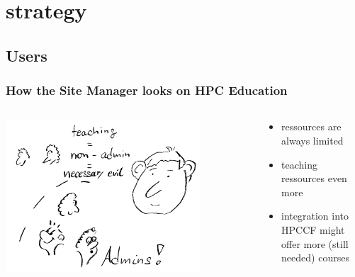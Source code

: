 \section[Certification Strategy]{strategy}

\subsection[What's in for Users]{Users}

\begin{frame}
  \frametitle{How the Site Manager looks on HPC Education}
  \begin{columns}
   \begin{column}{0.6\textwidth}
    \centering
    \includegraphics[width=0.8\textwidth]{images/runner}
   \end{column}
   \begin{column}{0.4\textwidth}
    \pause
    \begin{itemize}[<+->]
     \item ressources are always limited
     \item teaching ressources even more
     \item integration into HPCCF might offer more (still needed) courses
    \end{itemize}
   \end{column}
  \end{columns}
\end{frame}



